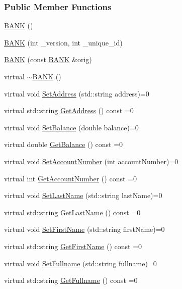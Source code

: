 \subsubsection*{Public Member Functions}
\begin{DoxyCompactItemize}
\item 
\hyperlink{class_b_a_n_k_a0bc938356cebff14fb0560264abe5a34}{B\+A\+NK} ()
\item 
\hyperlink{class_b_a_n_k_a7382dd275d8f4f10a8b53ccbc93e1e87}{B\+A\+NK} (int \+\_\+version, int \+\_\+unique\+\_\+id)
\item 
\hyperlink{class_b_a_n_k_a4dd657c30039ea00a040e6226c23ccd4}{B\+A\+NK} (const \hyperlink{class_b_a_n_k}{B\+A\+NK} \&orig)
\item 
virtual \hyperlink{class_b_a_n_k_ad609a1e004efdebab6495d95eced2346}{$\sim$\+B\+A\+NK} ()
\item 
virtual void \hyperlink{class_b_a_n_k_a4044c2f37c8b55b65ed5d57f1867e508}{Set\+Address} (std\+::string address)=0
\item 
virtual std\+::string \hyperlink{class_b_a_n_k_af1847278d240ceb2b831f03c7e039e07}{Get\+Address} () const =0
\item 
virtual void \hyperlink{class_b_a_n_k_a43bef9f486c88a2dc4906eee0e38a394}{Set\+Balance} (double balance)=0
\item 
virtual double \hyperlink{class_b_a_n_k_ae0fc62108895cddad418b23cb6d15f58}{Get\+Balance} () const =0
\item 
virtual void \hyperlink{class_b_a_n_k_a1134e7e3d219b7a3aaee42410aa19dfb}{Set\+Account\+Number} (int account\+Number)=0
\item 
virtual int \hyperlink{class_b_a_n_k_a781f774d1b3fd7437563811b015cbc8c}{Get\+Account\+Number} () const =0
\item 
virtual void \hyperlink{class_b_a_n_k_a480fa0973e3e27df92be6767b2f9a652}{Set\+Last\+Name} (std\+::string last\+Name)=0
\item 
virtual std\+::string \hyperlink{class_b_a_n_k_a6588652e6baae302caa39228ecf1606a}{Get\+Last\+Name} () const =0
\item 
virtual void \hyperlink{class_b_a_n_k_a4baa20e9389c4a592cb0d172c053bf4e}{Set\+First\+Name} (std\+::string first\+Name)=0
\item 
virtual std\+::string \hyperlink{class_b_a_n_k_a6b50fbebbe0d807ff3bc36ad6dbe01b8}{Get\+First\+Name} () const =0
\item 
virtual void \hyperlink{class_b_a_n_k_a02a2f543667403bad41ad614ac9bbde2}{Set\+Fullname} (std\+::string fullname)=0
\item 
virtual std\+::string \hyperlink{class_b_a_n_k_a05d6f0670c42e995ebd72cd4ade4305f}{Get\+Fullname} () const =0
\end{DoxyCompactItemize}


